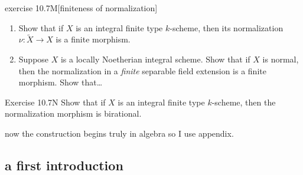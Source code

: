 \begin{thing6}{exercise 10.7M}[finiteness of normalization]\leavevmode
\begin{enumerate}[label=(\alph*)]
\item Show that if \(X\) is an integral finite type \(k\)-scheme, then its normalization \(\nu:\tilde{X}\to X\) is a finite morphism.
\item Suppose \(X\) is a locally Noetherian integral scheme. Show that if \(X\) is normal, then the normalization in a \textit{finite} separable field extension is a finite morphism. Show that…
\end{enumerate}
\begin{thing6}{Exercise 10.7N}\leavevmode
Show that if \(X\) is an integral finite type \(k\)-scheme, then the normalization morphism is birational.
\end{thing6}

now the construction begins truly in algebra so I use \cite{sysy} appendix.
\end{thing6}

\subsection{a first introduction}


